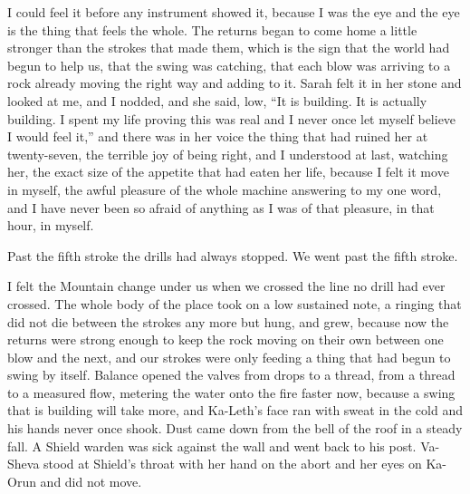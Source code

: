 I could feel it before any instrument showed it, because I was the eye and the eye is the thing that feels the whole. The returns began to come home a little stronger than the strokes that made them, which is the sign that the world had begun to help us, that the swing was catching, that each blow was arriving to a rock already moving the right way and adding to it. Sarah felt it in her stone and looked at me, and I nodded, and she said, low, ``It is building. It is actually building. I spent my life proving this was real and I never once let myself believe I would feel it,'' and there was in her voice the thing that had ruined her at twenty-seven, the terrible joy of being right, and I understood at last, watching her, the exact size of the appetite that had eaten her life, because I felt it move in myself, the awful pleasure of the whole machine answering to my one word, and I have never been so afraid of anything as I was of that pleasure, in that hour, in myself.\par

\ornament

Past the fifth stroke the drills had always stopped. We went past the fifth stroke.\par

I felt the Mountain change under us when we crossed the line no drill had ever crossed. The whole body of the place took on a low sustained note, a ringing that did not die between the strokes any more but hung, and grew, because now the returns were strong enough to keep the rock moving on their own between one blow and the next, and our strokes were only feeding a thing that had begun to swing by itself. Balance opened the valves from drops to a thread, from a thread to a measured flow, metering the water onto the fire faster now, because a swing that is building will take more, and Ka-Leth's face ran with sweat in the cold and his hands never once shook. Dust came down from the bell of the roof in a steady fall. A Shield warden was sick against the wall and went back to his post. Va-Sheva stood at Shield's throat with her hand on the abort and her eyes on Ka-Orun and did not move.\par

